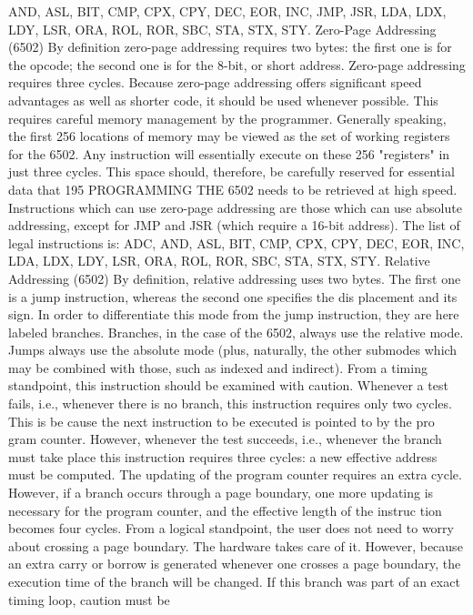 \documentclass{book}
\begin{document}
AND, ASL, BIT, CMP, CPX, CPY, DEC, EOR, INC, JMP, JSR,
LDA, LDX, LDY, LSR, ORA, ROL, ROR, SBC, STA, STX, STY.
Zero-Page Addressing (6502)
By definition zero-page addressing requires two bytes: the first
one is for the opcode; the second one is for the 8-bit, or short
address.
Zero-page addressing requires three cycles. Because zero-page
addressing offers significant speed advantages as well as shorter
code, it should be used whenever possible. This requires careful
memory management by the programmer. Generally speaking,
the first 256 locations of memory may be viewed as the set of
working registers for the 6502. Any instruction will essentially
execute on these 256 "registers" in just three cycles. This space
should, therefore, be carefully reserved for essential data that
195
PROGRAMMING THE 6502
needs to be retrieved at high speed.
Instructions which can use zero-page addressing are those
which can use absolute addressing, except for JMP and JSR
(which require a 16-bit address).
The list of legal instructions is: ADC, AND, ASL, BIT, CMP,
CPX, CPY, DEC, EOR, INC, LDA, LDX, LDY, LSR, ORA,
ROL, ROR, SBC, STA, STX, STY.
Relative Addressing (6502)
By definition, relative addressing uses two bytes. The first one
is a jump instruction, whereas the second one specifies the dis
placement and its sign. In order to differentiate this mode from
the jump instruction, they are here labeled branches. Branches,
in the case of the 6502, always use the relative mode. Jumps
always use the absolute mode (plus, naturally, the other submodes
which may be combined with those, such as indexed and
indirect). From a timing standpoint, this instruction should be
examined with caution. Whenever a test fails, i.e., whenever there
is no branch, this instruction requires only two cycles. This is be
cause the next instruction to be executed is pointed to by the pro
gram counter. However, whenever the test succeeds, i.e., whenever
the branch must take place this instruction requires three cycles: a
new effective address must be computed. The updating of the
program counter requires an extra cycle. However, if a branch
occurs through a page boundary, one more updating is necessary
for the program counter, and the effective length of the instruc
tion becomes four cycles.
From a logical standpoint, the user does not need to worry about
crossing a page boundary. The hardware takes care of it. However,
because an extra carry or borrow is generated whenever one crosses
a page boundary, the execution time of the branch will be changed.
If this branch was part of an exact timing loop, caution must be
\end{document}
